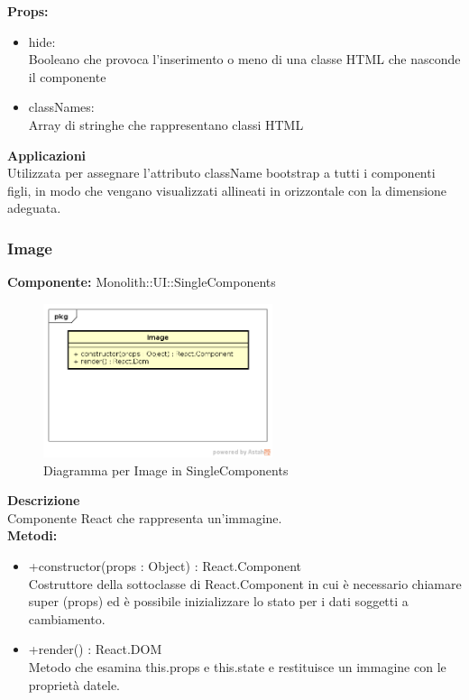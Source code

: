 \textbf{Props:} 
\begin{itemize}
\item hide: 
\\
Booleano che provoca l'inserimento o meno di una classe HTML che nasconde il componente
\item classNames: 
\\
Array di stringhe che rappresentano classi HTML

\end{itemize} 


\textbf{Applicazioni}\\
Utilizzata per assegnare l'attributo className bootstrap a tutti i componenti figli, in modo che vengano visualizzati allineati in orizzontale con la dimensione adeguata. 


\clearpage

\subsubsection{Image}
\textbf{Componente:}  Monolith::UI::SingleComponents\\
   \FloatBarrier
   \begin{figure}[ht]
   \centering
   \includegraphics[width=0.6\textwidth]{img/single-Image.png}
   \caption{{Diagramma per Image in SingleComponents}}
\end{figure}
\FloatBarrier
\textbf{Descrizione}\\
Componente React che rappresenta un'immagine. \\
\textbf{Metodi:} 
\begin{itemize}
\item +constructor(props : Object) : React.Component 
\\
Costruttore della sottoclasse di React.Component in cui è necessario chiamare super (props) ed è possibile inizializzare lo stato per i dati soggetti a cambiamento.
\item +render() : React.DOM 
\\
Metodo che esamina this.props e this.state e restituisce un immagine con le proprietà datele.
\end{itemize}

